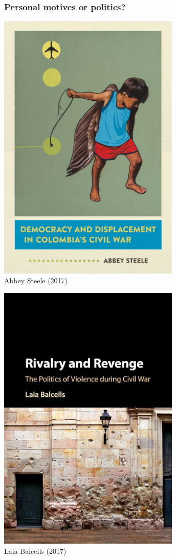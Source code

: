 \documentclass[aspectratio=43]{beamer}
\begin{document}
\begin{frame}
\frametitle{Personal motives or politics?}
\centering

\begin{minipage}{0.49\textwidth}\centering
  \includegraphics[width = 0.65\textwidth]{img/steele2017}\\
  {\footnotesize Abbey Steele (2017)}
\end{minipage}\hfill
\begin{minipage}{0.49\textwidth}\centering
  \includegraphics[width = 0.65\textwidth]{img/balcells2017}\\
  {\footnotesize Laia Balcells (2017)}
\end{minipage}


\end{frame}
\end{document}
